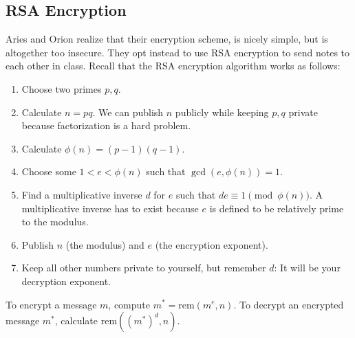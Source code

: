 \documentclass[12pt,letterpaper]{article}
\begin{document}
  \subsection*{RSA Encryption}
    Aries and Orion realize that their encryption scheme, is nicely simple, but is altogether
    too insecure. They opt instead to use RSA encryption to send notes to each other
in class. Recall that the RSA encryption algorithm works as follows:
\begin{enumerate}[1. ]
    \item Choose two primes $p, q$.
    \item Calculate $n = pq$. We can publish $n$ publicly while keeping $p, q$ private because factorization is a hard problem.
    \item Calculate $\phi(n) = (p - 1)(q -1)$.
    \item Choose some $1 < e < \phi(n)$ such that $\gcd(e, \phi(n)) = 1$.
    \item Find a multiplicative inverse $d$ for $e$ such that $de \equiv 1 \pmod{\phi(n)}$. A multiplicative inverse has to exist because $e$ is defined to be relatively prime to the modulus.
    \item Publish $n$ (the modulus) and $e$ (the encryption exponent).
    \item Keep all other numbers private to yourself, but remember $d$: It will be your decryption exponent.
\end{enumerate}

To encrypt a message $m$, compute $m^* = \textrm{rem}(m^e, n)$. To decrypt an encrypted message $m^*$, calculate $\textrm{rem}((m^*)^d,  n)$.
\end{document}
